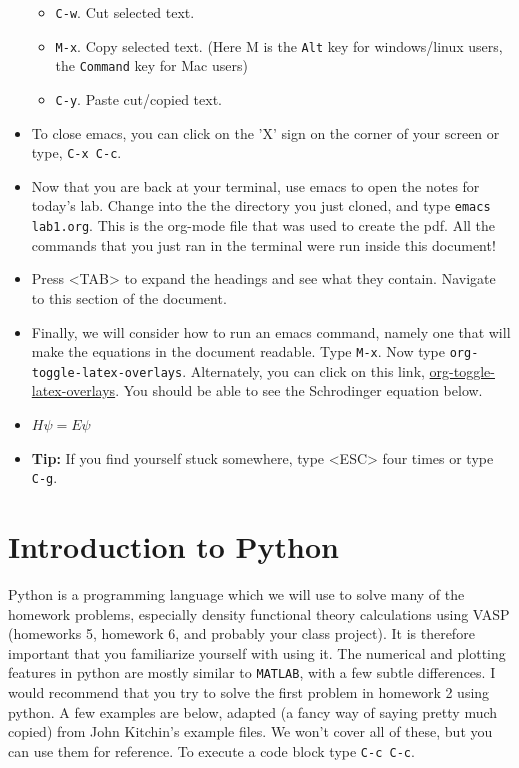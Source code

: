 \documentclass[11pt]{article}
\begin{document}
\begin{itemize}
\begin{itemize}
\item \verb~C-w~. Cut selected text.
\item \verb~M-x~. Copy selected text. (Here M is the \texttt{Alt} key for windows/linux users, the \texttt{Command} key for Mac users)
\item \verb~C-y~. Paste cut/copied text.
\end{itemize}

\item To close emacs, you can click on the 'X' sign on the corner of your screen or type, \verb~C-x C-c~.

\item Now that you are back at your terminal, use emacs to open the notes for today's lab. Change into the the directory you just cloned, and type \verb~emacs lab1.org~. This is the org-mode file that was used to create the pdf. All the commands that you just ran in the terminal were run inside this document!

\item Press <TAB> to expand the headings and see what they contain. Navigate to this section of the document.

\item Finally, we will consider how to run an emacs command, namely one that will make the equations in the document readable. Type \verb~M-x~. Now type \verb~org-toggle-latex-overlays~. Alternately, you can click on this link, \url{org-toggle-latex-overlays}. You should be able to see the Schrodinger equation below.

\item $H\psi = E\psi$

\item \textbf{Tip:} If you find yourself stuck somewhere, type <ESC> four times or type \verb~C-g~.
\end{itemize}


\section{Introduction to Python}
\label{sec-3}

Python is a programming language which we will use to solve many of the homework problems, especially density functional theory calculations using VASP (homeworks 5, homework 6, and probably your class project). It is therefore important that you familiarize yourself with using it. The numerical and plotting features in python are mostly similar to \texttt{MATLAB}, with a few subtle differences. I would recommend that you try to solve the first problem in homework 2 using python. A few examples are below, adapted (a fancy way of saying pretty much copied) from John Kitchin's example files. We won't cover all of these, but you can use them for reference. To execute a code block type \verb~C-c C-c~.
\end{document}
